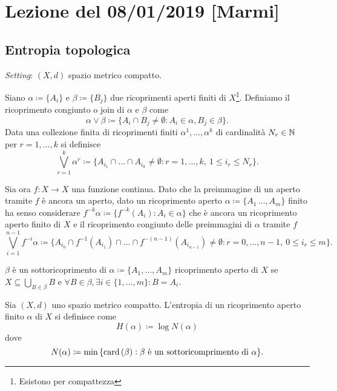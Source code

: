 \section{Lezione del 08/01/2019 [Marmi]}

\subsection{Entropia topologica}

\emph{Setting}: $ (X, d) $ spazio metrico compatto.

\begin{definition}
    Siano $ \alpha \coloneqq \{A_i\} $ e $ \beta \coloneqq \{B_j\} $ due ricoprimenti aperti finiti di $ X $\footnote{Esistono per compattezza}. Definiamo il ricoprimento congiunto o join di $ \alpha $ e $ \beta $ come
    \[
        \alpha \vee \beta \coloneqq \{A_i \cap B_j \neq \emptyset : A_i \in \alpha, B_j \in \beta\}.
    \]
    Data una collezione finita di ricoprimenti finiti $ \alpha^1, \ldots, \alpha^k $ di cardinalità $ N_r \in \mathbb{N} $ per $ r = 1, \ldots, k $ si definisce
    \[
        \bigvee_{r=1}^{k} \alpha^r \coloneqq \{A_{i_1} \cap \ldots \cap A_{i_k} \neq \emptyset : r = 1, \ldots, k, \ 1 \leq i_r \leq N_r\}.
    \]
\end{definition}

Sia ora $ f \colon X \to X $ una funzione continua. Dato che la preimmagine di un aperto tramite $ f $ è ancora un aperto, dato un ricoprimento aperto $ \alpha \coloneqq \{A_1\, \ldots, A_m\} $ finito ha senso considerare $ f^{-k}\alpha \coloneqq \{f^{-k}(A_i) : A_i \in \alpha\} $ che è ancora un ricoprimento aperto finito di $ X $ e il ricoprimento congiunto delle preimmagini di $ \alpha $ tramite $ f $
\[
    \bigvee_{i=1}^{n-1} f^{-i}\alpha \coloneqq \{A_{i_0} \cap f^{-1}(A_{i_1}) \cap \ldots \cap f^{-(n-1)}(A_{i_{n-1}}) \neq \emptyset : r = 0, \ldots, n-1, \ 0 \leq i_r \leq m\}.
\]

\begin{definition}[sottoricoprimento]
    $ \beta $ è un sottoricoprimento di $ \alpha \coloneqq \{A_1, \ldots, A_m\} $ ricoprimento aperto di $ X $ se $ X \subseteq \bigcup_{B \in \beta} B $ e $ \forall B \in \beta, \exists i \in \{1, \ldots, m\} : B = A_i $.
\end{definition}

\begin{definition}
    Sia $ (X, d) $ uno spazio metrico compatto. L'entropia di un ricoprimento aperto finito $ \alpha $ di $ X $ si definisce come
    \[
        H(\alpha) \coloneqq \log N(\alpha)
    \]
    dove
    \[
        N(\alpha) \coloneqq \min{\{\operatorname{card}{(\beta)} : \text{$ \beta $ è un sottoricomprimento di $ \alpha $}}\}.
    \]
\end{definition}

